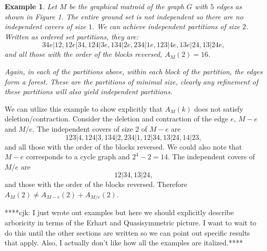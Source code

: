 \documentclass[12pt,reqno]{amsart}
\numberwithin{definition}{section}
\newtheorem{example}[definition]{Example}
\begin{document}
\begin{example}
Let $M$ be the graphical matroid of the graph $G$ with $5$ edges as
shown in Figure 1.  The entire ground set is not independent so there
are no independent covers of size $1$.  We can achieve independent
partitions of size $2$.  Written as ordered set partitions, they are:
$$ 34e|12, 12e|34, 124|3e, 134|2e, 234|1e, 123|4e, 13e|24, 13|24e, $$
and all those with the order of the blocks reversed, $A_M(2) = 16$.  

Again, in each of the partitions above, within each block of the
partition, the edges form a forest.  These are the partitions of
minimal size, clearly any refinement of these partitions will also
yield independent partitions.

\end{example}

We can utlize this example to show explicitly that $A_M(k)$ does not
satisfy deletion/contraction.  Consider the deletion and contraction
of the edge $e$, $M-e$ and $M/e$.  The independent covers of size $2$
of $M-e$ are
$$ 123|4, 124|3, 134|2, 234|1, 12|34, 13|24, 14|23, $$ and all those
with the order of the blocks reversed.  We could also note that $M-e$
corresponds to a cycle graph and $2^4 - 2 = 14$.  The independent
covers of $M/e$ are $$12|34, 13|24,$$ and those with the order of the
blocks reversed.  Therefore $A_M(2) \neq A_{M-e}(2) + A_{M/e}(2)$.







****cjk: I just wrote out examples but here we should explicitly describe arboricity in terms of the Erhart and Quasisymmetric picture.  I want to wait to do this until the other sections are written so we can point out specific results that apply.  Also, I actually don't like how all the examples are italized.****
\end{document}
